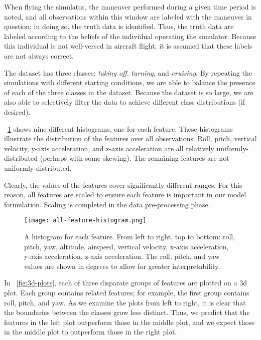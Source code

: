 \documentclass[../main.tex]{subfiles}
\begin{document}

When flying the simulator, the maneuver performed during a given time period is noted, and all observations within this window are labeled with the maneuver in question; in doing so, the truth data is identified. Thus, the truth data are labeled according to the beliefs of the individual operating the simulator. Because this individual is not well-versed in aircraft flight, it is assumed that these labels are not always correct.


The dataset has three classes: \textit{taking off}, \textit{turning}, and \textit{cruising}. By repeating the simulations with different starting conditions, we are able to balance the presence of each of the three classes in the dataset. Because the dataset is so large, we are also able to selectively filter the data to achieve different class distributions (if desired).


\figurename \ \ref{fig:hist} shows nine different histograms, one for each feature. These histograms illustrate the distribution of the features over all observations. Roll, pitch, vertical velocity, y-axis acceleration, and z-axis acceleration are all relatively uniformly-distributed (perhaps with some skewing). The remaining features are not uniformly-distributed.

Clearly, the values of the features cover significantly different ranges. For this reason, all features are scaled to ensure each feature is important in our model formulation. Scaling is completed in the data pre-processing phase.

\begin{figure}
    \centerline{\texttt{[image: all-feature-histogram.png]}}
    \caption{A histogram for each feature. From left to right, top to bottom: roll, pitch, yaw, altitude, airspeed, vertical velocity, x-axis acceleration, y-axis acceleration, z-axis acceleration. The roll, pitch, and yaw values are shown in degrees to allow for greater interpretability.}
    \label{fig:hist}
\end{figure}

In \figurename \ \ref{fig:3d-plots}, each of three disparate groups of features are plotted on a \ac{3d} plot. Each group contains related features; for example, the first group contains roll, pitch, and yaw. As we examine the plots from left to right, it is clear that the boundaries between the classes grow less distinct. Thus, we predict that the features in the left plot outperform those in the middle plot, and we expect those in the middle plot to outperform those in the right plot.
\end{document}
